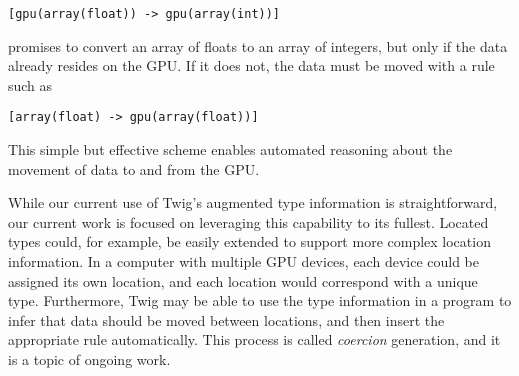 \begin{verbatim}
[gpu(array(float)) -> gpu(array(int))]
\end{verbatim}

promises to convert an array of floats to an array of integers, but only if the
data already resides on the GPU. If it does not, the data must be moved with a
rule such as

\begin{verbatim}
[array(float) -> gpu(array(float))]
\end{verbatim}

This simple but effective scheme enables automated reasoning about the movement
of data to and from the GPU.

While our current use of Twig's augmented type information is straightforward,
our current work is focused on leveraging this capability to its fullest.
Located types could, for example, be easily extended to support more complex
location information. In a computer with multiple GPU devices, each device could
be assigned its own location, and each location would correspond with a unique
type. Furthermore, Twig may be able to use the type information in a program to
infer that data should be moved between locations, and then insert the
appropriate rule automatically. This process is called \emph{coercion}
generation, and it is a topic of ongoing work.
